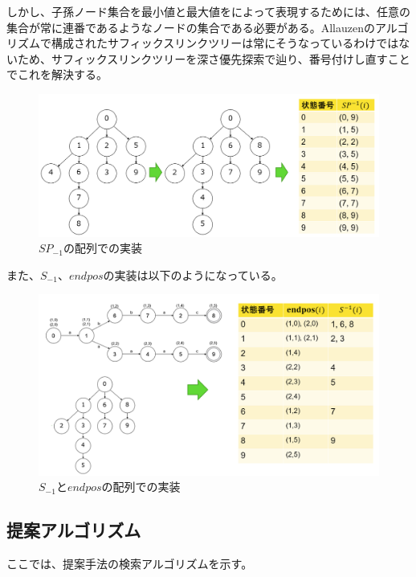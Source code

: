 \documentclass[11pt,a4paper]{jreport}
\begin{document}
  しかし、子孫ノード集合を最小値と最大値をによって表現するためには、任意の集合が常に連番であるようなノードの集合である必要がある。Allauzenのアルゴリズムで構成されたサフィックスリンクツリーは常にそうなっているわけではないため、サフィックスリンクツリーを深さ優先探索で辿り、番号付けし直すことでこれを解決する。

  \begin{figure}[htbp]
    \centering
    \includegraphics[width=15cm]{sp.png}

    \caption{$SP_{-1}の配列での実装$}
  \end{figure}
  \newpage

  また、$S_{-1}、endpos$の実装は以下のようになっている。

  \begin{figure}[htbp]
    \centering
    \includegraphics[width=15cm]{se.png}

    \caption{$S_{-1}とendposの配列での実装$}
  \end{figure}
  \newpage

  \subsection{提案アルゴリズム}
  ここでは、提案手法の検索アルゴリズムを示す。
\end{document}
